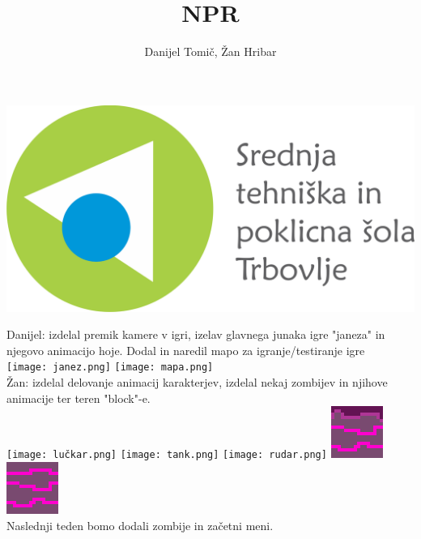 \documentclass[a4paper]{article}
\author{Danijel Tomič, Žan Hribar}
\title{NPR}
\begin{document}
\maketitle

\begin{center}
\includegraphics[scale=0.5]{Logotip-z-napisom.png}
\end{center}
\newpage
Danijel: izdelal premik kamere v igri, izelav glavnega junaka igre "janeza" in njegovo animacijo hoje. Dodal in naredil mapo za igranje/testiranje igre 
\\
\texttt{[image: janez.png]} \texttt{[image: mapa.png]}\\
Žan: izdelal delovanje animacij karakterjev, izdelal nekaj zombijev in njihove animacije ter teren "block"-e.\\
\texttt{[image: lučkar.png]} \texttt{[image: tank.png]} \texttt{[image: rudar.png]} \includegraphics[scale=0.5]{grass.png} \includegraphics[scale=0.5]{dirt.png}\\
Naslednji teden bomo dodali zombije in začetni meni.
\end{document}
